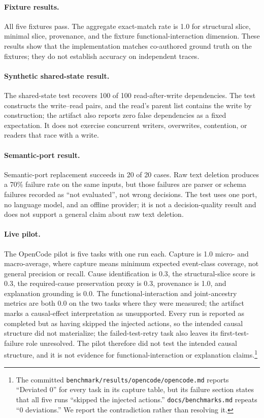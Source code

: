 \documentclass[11pt]{article}
\newcommand{\code}[1]{\textcolor{codegreen}{\texttt{#1}}}
\begin{document}
\paragraph{Fixture results.} All five fixtures pass. The aggregate exact-match rate is 1.0 for structural slice, minimal slice, provenance, and the fixture functional-interaction dimension. These results show that the implementation matches co-authored ground truth on the fixtures; they do not establish accuracy on independent traces.

\paragraph{Synthetic shared-state result.} The shared-state test recovers 100 of 100 read-after-write dependencies. The test constructs the write--read pairs, and the read's parent list contains the write by construction; the artifact also reports zero false dependencies as a fixed expectation. It does not exercise concurrent writers, overwrites, contention, or readers that race with a write.

\paragraph{Semantic-port result.} Semantic-port replacement succeeds in 20 of 20 cases. Raw text deletion produces a 70\% failure rate on the same inputs, but those failures are parser or schema failures recorded as ``not evaluated'', not wrong decisions. The test uses one port, no language model, and an offline provider; it is not a decision-quality result and does not support a general claim about raw text deletion.

\paragraph{Live pilot.} The OpenCode pilot is five tasks with one run each. Capture is 1.0 micro- and macro-average, where capture means minimum expected event-class coverage, not general precision or recall. Cause identification is 0.3, the structural-slice score is 0.3, the required-cause preservation proxy is 0.3, provenance is 1.0, and explanation grounding is 0.0. The functional-interaction and joint-ancestry metrics are both 0.0 on the two tasks where they were measured; the artifact marks a causal-effect interpretation as unsupported. Every run is reported as completed but as having skipped the injected actions, so the intended causal structure did not materialize; the failed-test-retry task also leaves its first-test-failure role unresolved. The pilot therefore did not test the intended causal structure, and it is not evidence for functional-interaction or explanation claims.\footnote{The committed \code{benchmark/results/opencode/opencode.md} reports ``Deviated 0'' for every task in its capture table, but its failure section states that all five runs ``skipped the injected actions.'' \code{docs/benchmarks.md} repeats ``0 deviations.'' We report the contradiction rather than resolving it.}
\end{document}
